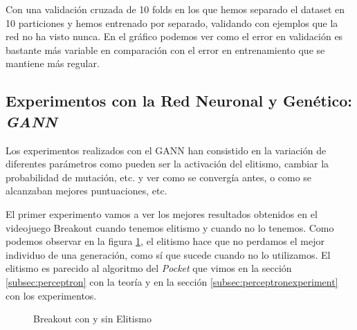 Con una validación cruzada de 10 folds en los que hemos separado el dataset en 10 particiones y hemos entrenado por separado, validando con ejemplos que la red no ha visto nunca. En el gráfico podemos ver como el error en validación es bastante más variable en comparación con el error en entrenamiento que se mantiene más regular.

\newpage
\subsection{Experimentos con la Red Neuronal y Genético: \textit{GANN}}
\label{subsubsec:nnexperiments:GANN}

Los experimentos realizados con el GANN han consistido en la variación de diferentes parámetros como pueden ser la activación del elitismo, cambiar la probabilidad de mutación, etc. y ver como se convergía antes, o como se alcanzaban mejores puntuaciones, etc.

El primer experimento vamos a ver los mejores resultados obtenidos en el videojuego Breakout cuando tenemos elitismo y cuando no lo tenemos. Como podemos observar en la figura \ref{fig:breakoutWithAndWithoutElitism}, el elitismo hace que no perdamos el mejor individuo de una generación, como sí que sucede cuando no lo utilizamos. El elitismo es parecido al algoritmo del \textit{Pocket} que vimos en la sección \ref{subsec:perceptron} con la teoría y en la sección \ref{subsec:perceptronexperiment} con los experimentos.

\begin{figure}[H]
    \centering
    
    
    \caption{Breakout con y sin Elitismo}
    \label{fig:breakoutWithAndWithoutElitism}
\end{figure}

